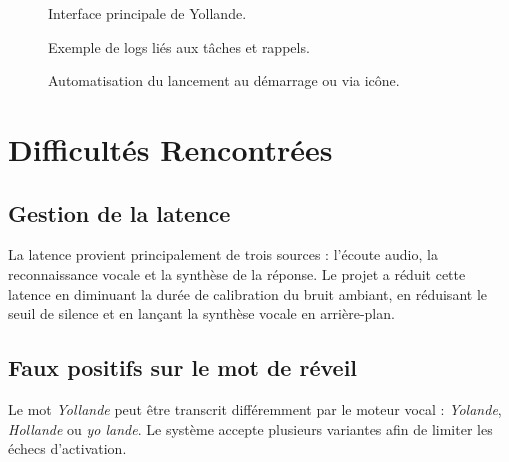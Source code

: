 \documentclass[12pt,a4paper]{report}
\begin{document}

\begin{figure}[H]
  \centering
  \caption{Interface principale de Yollande.}
  \label{fig:interface}
\end{figure}

\begin{figure}[H]
  \centering
  \caption{Exemple de logs liés aux tâches et rappels.}
  \label{fig:logs}
\end{figure}

\begin{figure}[H]
  \centering
  \caption{Automatisation du lancement au démarrage ou via icône.}
  \label{fig:deploiement}
\end{figure}

\chapter{Difficultés Rencontrées}

\section{Gestion de la latence}

La latence provient principalement de trois sources : l'écoute audio, la
reconnaissance vocale et la synthèse de la réponse. Le projet a réduit cette
latence en diminuant la durée de calibration du bruit ambiant, en réduisant le
seuil de silence et en lançant la synthèse vocale en arrière-plan.

\section{Faux positifs sur le mot de réveil}

Le mot \textit{Yollande} peut être transcrit différemment par le moteur vocal :
\textit{Yolande}, \textit{Hollande} ou \textit{yo lande}. Le système accepte
plusieurs variantes afin de limiter les échecs d'activation.
\end{document}
